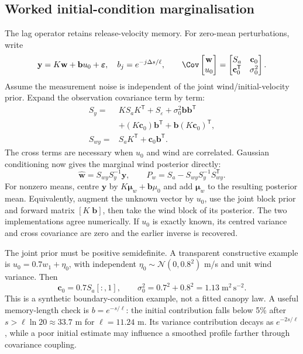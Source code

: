 \subsection{Worked initial-condition marginalisation}
The lag operator retains release-velocity memory. For zero-mean perturbations, write
\begin{equation}
 \mathbf y=K\mathbf w+\mathbf b u_0+\boldsymbol\varepsilon,
 \quad b_j=e^{-j\Delta s/\ell},\qquad
 \Cov\begin{bmatrix}\mathbf w\\u_0\end{bmatrix}
 =\begin{bmatrix}S_a&\mathbf c_0\\\mathbf c_0^{\mathsf T}&\sigma_0^2\end{bmatrix}.
\end{equation}
Assume the measurement noise is independent of the joint wind/initial-velocity prior. Expand the observation covariance term by term:
\begin{align}
 S_y={}&KS_aK^{\mathsf T}+S_\varepsilon+\sigma_0^2\mathbf b\mathbf b^{\mathsf T}\\
 &+(K\mathbf c_0)\mathbf b^{\mathsf T}+\mathbf b(K\mathbf c_0)^{\mathsf T},\\
 S_{wy}={}&S_aK^{\mathsf T}+\mathbf c_0\mathbf b^{\mathsf T}.
\end{align}
The cross terms are necessary when $u_0$ and wind are correlated. Gaussian conditioning now gives the marginal wind posterior directly:
\begin{equation}
 \boxed{\widehat{\mathbf w}=S_{wy}S_y^{-1}\mathbf y,\qquad
 P_w=S_a-S_{wy}S_y^{-1}S_{wy}^{\mathsf T}.}
\end{equation}
For nonzero means, centre $\mathbf y$ by $K\boldsymbol\mu_w+\mathbf b\mu_0$ and add $\boldsymbol\mu_w$ to the resulting posterior mean. Equivalently, augment the unknown vector by $u_0$, use the joint block prior and forward matrix $[K\;\mathbf b]$, then take the wind block of its posterior. The two implementations agree numerically. If $u_0$ is exactly known, its centred variance and cross covariance are zero and the earlier inverse is recovered.

The joint prior must be positive semidefinite. A transparent constructive example is $u_0=0.7w_1+\eta_0$, with independent $\eta_0\sim\mathcal N(0,0.8^2)$ m/s and unit wind variance. Then
\begin{equation}
 \mathbf c_0=0.7S_a[:,1],\qquad \sigma_0^2=0.7^2+0.8^2=1.13\;\mathrm{m^2\,s^{-2}}.
\end{equation}
This is a synthetic boundary-condition example, not a fitted canopy law. A useful memory-length check is $b=e^{-s/\ell}$: the initial contribution falls below 5\% after $s>\ell\ln20\approx33.7$ m for $\ell=11.24$ m. Its variance contribution decays as $e^{-2s/\ell}$, while a poor initial estimate may influence a smoothed profile farther through covariance coupling.

